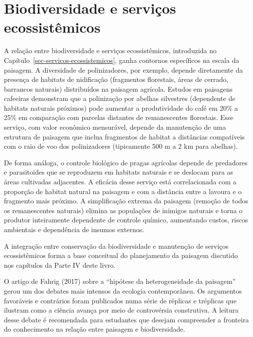 \documentclass[
  portuguese,
  11pt,
  a4paper,
  open=any]{scrbook}
\begin{document}
\section{Biodiversidade e serviços
ecossistêmicos}\label{biodiversidade-e-serviuxe7os-ecossistuxeamicos}

A relação entre biodiversidade e serviços ecossistêmicos, introduzida no
Capítulo~\ref{sec-servicos-ecossistemicos}, ganha contornos específicos
na escala da paisagem. A diversidade de polinizadores, por exemplo,
depende diretamente da presença de habitats de nidificação (fragmentos
florestais, áreas de cerrado, barrancos naturais) distribuídos na
paisagem agrícola. Estudos em paisagens cafeeiras demonstram que a
polinização por abelhas silvestres (dependente de habitats naturais
próximos) pode aumentar a produtividade do café em 20\% a 25\% em
comparação com parcelas distantes de remanescentes florestais. Esse
serviço, com valor econômico mensurável, depende da manutenção de uma
estrutura de paisagem que inclua fragmentos de habitat a distâncias
compatíveis com o raio de voo dos polinizadores (tipicamente 500 m a 2
km para abelhas).

De forma análoga, o controle biológico de pragas agrícolas depende de
predadores e parasitoides que se reproduzem em habitats naturais e se
deslocam para as áreas cultivadas adjacentes. A eficácia desse serviço
está correlacionada com a proporção de habitat natural na paisagem e com
a distância entre a lavoura e o fragmento mais próximo. A simplificação
extrema da paisagem (remoção de todos os remanescentes naturais) elimina
as populações de inimigos naturais e torna o produtor inteiramente
dependente de controle químico, aumentando custos, riscos ambientais e
dependência de insumos externos.

A integração entre conservação da biodiversidade e manutenção de
serviços ecossistêmicos forma a base conceitual do planejamento da
paisagem discutido nos capítulos da Parte IV deste livro.

\begin{tcolorbox}[enhanced jigsaw, colbacktitle=quarto-callout-tip-color!10!white, coltitle=black, opacityback=0, breakable, left=2mm, colback=white, bottomtitle=1mm, toptitle=1mm, titlerule=0mm, arc=.35mm, opacitybacktitle=0.6, leftrule=.75mm, colframe=quarto-callout-tip-color-frame, title=\textcolor{quarto-callout-tip-color}{\faLightbulb}\hspace{0.5em}{Para aprofundar}, rightrule=.15mm, bottomrule=.15mm, toprule=.15mm]

O artigo de Fahrig (2017) sobre a ``hipótese da heterogeneidade da
paisagem'' gerou um dos debates mais intensos da ecologia contemporânea.
Os argumentos favoráveis e contrários foram publicados numa série de
réplicas e tréplicas que ilustram como a ciência avança por meio de
controvérsia construtiva. A leitura desse debate é recomendada para
estudantes que desejam compreender a fronteira do conhecimento na
relação entre paisagem e biodiversidade.

\end{tcolorbox}
\end{document}
